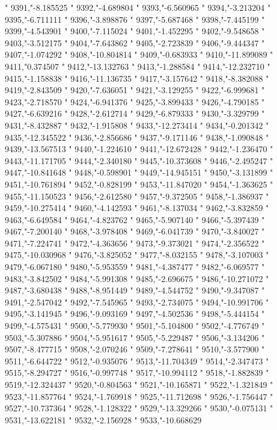 "
9391,"-8.185525
"
9392,"-4.689804
"
9393,"-6.560965
"
9394,"-3.213204
"
9395,"-6.711111
"
9396,"-3.898876
"
9397,"-5.687468
"
9398,"-7.445199
"
9399,"-4.543901
"
9400,"-7.115024
"
9401,"-1.452295
"
9402,"-9.548658
"
9403,"-3.512175
"
9404,"-7.643862
"
9405,"-2.723839
"
9406,"-9.444347
"
9407,"-1.074292
"
9408,"-10.804814
"
9409,"-0.683933
"
9410,"-11.899089
"
9411,"0.374507
"
9412,"-13.132763
"
9413,"-1.288584
"
9414,"-12.232710
"
9415,"-1.158838
"
9416,"-11.136735
"
9417,"-3.157642
"
9418,"-8.382088
"
9419,"-2.843509
"
9420,"-7.636051
"
9421,"-3.129255
"
9422,"-6.999681
"
9423,"-2.718570
"
9424,"-6.941376
"
9425,"-3.899433
"
9426,"-4.790185
"
9427,"-6.639216
"
9428,"-2.612714
"
9429,"-6.879333
"
9430,"-3.329799
"
9431,"-8.432887
"
9432,"-1.915808
"
9433,"-12.273414
"
9434,"-0.201342
"
9435,"-12.345522
"
9436,"-2.856686
"
9437,"-9.171146
"
9438,"-1.090848
"
9439,"-13.567513
"
9440,"-1.224610
"
9441,"-12.672428
"
9442,"-1.236470
"
9443,"-11.171705
"
9444,"-2.340180
"
9445,"-10.373608
"
9446,"-2.495247
"
9447,"-10.841648
"
9448,"-0.598901
"
9449,"-14.945151
"
9450,"-3.131899
"
9451,"-10.761894
"
9452,"-0.828199
"
9453,"-11.847020
"
9454,"-1.363625
"
9455,"-11.150523
"
9456,"-2.612580
"
9457,"-9.372505
"
9458,"-1.386937
"
9459,"-10.275414
"
9460,"-4.142593
"
9461,"-8.137034
"
9462,"-3.832859
"
9463,"-6.649584
"
9464,"-4.823762
"
9465,"-5.907140
"
9466,"-5.397439
"
9467,"-7.200140
"
9468,"-3.978408
"
9469,"-6.041739
"
9470,"-3.840027
"
9471,"-7.224741
"
9472,"-4.363656
"
9473,"-9.373021
"
9474,"-2.356522
"
9475,"-10.030968
"
9476,"-3.825052
"
9477,"-8.032155
"
9478,"-3.107003
"
9479,"-6.067180
"
9480,"-5.953559
"
9481,"-4.387477
"
9482,"-6.069577
"
9483,"-3.842502
"
9484,"-5.991308
"
9485,"-2.696675
"
9486,"-10.271072
"
9487,"-3.680438
"
9488,"-8.951449
"
9489,"-4.544752
"
9490,"-9.347087
"
9491,"-2.547042
"
9492,"-7.545965
"
9493,"-2.734075
"
9494,"-10.991706
"
9495,"-3.141945
"
9496,"-9.093169
"
9497,"-4.502536
"
9498,"-5.444154
"
9499,"-4.575431
"
9500,"-5.779930
"
9501,"-5.104800
"
9502,"-4.776749
"
9503,"-5.307886
"
9504,"-5.951617
"
9505,"-5.229487
"
9506,"-3.134206
"
9507,"-8.477715
"
9508,"-2.070246
"
9509,"-7.278641
"
9510,"-3.577900
"
9511,"-6.644722
"
9512,"-0.935076
"
9513,"-11.704349
"
9514,"-2.347473
"
9515,"-8.294727
"
9516,"-0.997748
"
9517,"-10.994112
"
9518,"-1.882839
"
9519,"-12.324437
"
9520,"-0.804563
"
9521,"-10.165871
"
9522,"-1.321849
"
9523,"-11.857764
"
9524,"-1.769918
"
9525,"-11.712698
"
9526,"-1.756447
"
9527,"-10.737364
"
9528,"-1.128322
"
9529,"-13.329266
"
9530,"-0.075131
"
9531,"-13.622181
"
9532,"-2.156928
"
9533,"-10.668629
